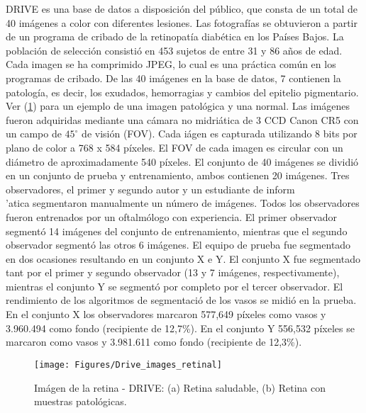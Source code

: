 DRIVE es una base de datos a disposici\'on del p\'ublico, que consta de un total de 40 im\'agenes a color con diferentes lesiones. Las fotograf\'ias se obtuvieron a partir de un programa de cribado de la retinopat\'ia diab\'etica en los Pa\'ises Bajos. La poblaci\'on de selecci\'on consisti\'o en 453 sujetos de entre 31 y 86 a\~nos de edad. Cada imagen se ha comprimido JPEG, lo cual es una pr\'actica com\'un en los programas de cribado. De las 40 im\'agenes en la base de datos, 7 contienen la patolog\'ia, es decir, los exudados, hemorragias y cambios del epitelio pigmentario. Ver (\ref{fig:Drive_images_retinal}) para un ejemplo de una imagen patológica y una normal. Las im\'agenes fueron adquiridas mediante una c\'amara no midriática de 3 CCD Canon CR5 con un campo de $45^{\circ}$ de visi\'on (FOV). Cada i\'agen es capturada utilizando 8 bits por plano de color a 768 {x} 584 p\'ixeles. El FOV de cada imagen es circular con un di\'ametro de aproximadamente 540 p\'ixeles. El conjunto de 40 im\'agenes se dividi\'o en un conjunto de prueba y entrenamiento, ambos contienen 20 im\'agenes. Tres observadores, el primer y segundo autor y un estudiante de inform\\'atica segmentaron manualmente un n\'umero de im\'agenes. Todos los observadores fueron entrenados por un oftalm\'ologo con experiencia. El primer observador segment\'o 14 im\'agenes del conjunto de entrenamiento, mientras que el segundo observador segment\'o las otros 6 im\'agenes. El equipo de prueba fue segmentado en dos ocasiones resultando en un conjunto X e Y. El conjunto X fue segmentado tant por el primer y segundo observador (13 y 7 im\'agenes, respectivamente), mientras el conjunto Y se segmentó por completo por el tercer observador. El rendimiento de los algoritmos de segmentaci\'o de los vasos se midi\'o en la prueba. En el conjunto X los observadores marcaron 577,649 p\'ixeles como vasos y 3.960.494 como fondo (recipiente de 12,7\%). En el conjunto Y 556,532 p\'ixeles se marcaron como vasos y 3.981.611 como fondo (recipiente de 12,3\%).\\


\begin{figure}[H]
	{
	\centering
	\texttt{[image: Figures/Drive\_images\_retinal]}
	\caption[Drive]{Im\'agen de la retina - DRIVE: (a) Retina saludable, (b) Retina con muestras patol\'ogicas.}
	\label{fig:Drive_images_retinal}
	}
\end{figure}	



